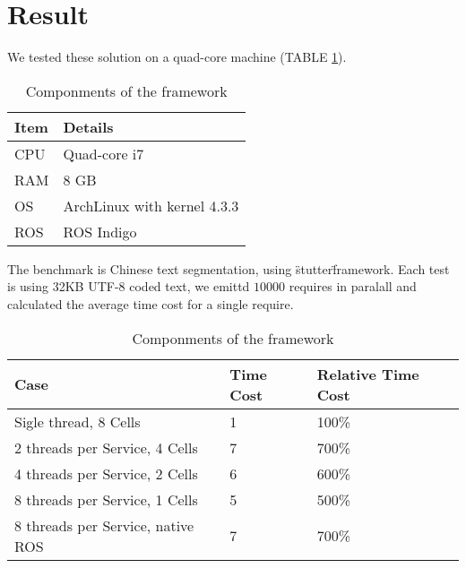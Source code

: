 \section{Result}

We tested these solution on a quad-core machine (TABLE \ref{table:machine}).

\begin{table}[h]
  \renewcommand{\arraystretch}{1.3}
  \caption{Componments of the framework}
  \label{table:machine}
  \centering
  \begin{tabular}{ll}
     \hline
     \bfseries Item & \bfseries Details \\
     \hline
     CPU & Quad-core i7 \\ 
     RAM & 8 GB \\
     OS  & ArchLinux with kernel 4.3.3 \\
     ROS & ROS Indigo \\
     \hline
  \end{tabular}
\end{table} 

The benchmark is Chinese text segmentation, using \"stutter\" framework.
Each test is using 32KB UTF-8 coded text, we emittd $10000$ requires in 
paralall and calculated the average time cost for a single require.

\begin{table}[h]
  \renewcommand{\arraystretch}{1.3}
  \caption{Componments of the framework}
  \label{table:textseg}
  \centering
  \begin{tabular}{lll}
     \hline
     \bfseries Case & \bfseries Time Cost & \bfseries Relative Time Cost \\
     \hline
     Sigle thread, 8 Cells  & 1 & 100\% \\
     2 threads per Service, 4 Cells & 7 & 700\% \\
     4 threads per Service, 2 Cells & 6 & 600\% \\
     8 threads per Service, 1 Cells & 5 & 500\% \\
     8 threads per Service, native ROS & 7 & 700\% \\
     \hline
  \end{tabular}
\end{table} 


